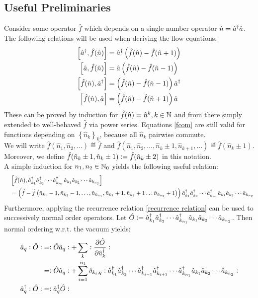 \subsection{Useful Preliminaries}
Consider some operator $\hat f$ which depends on a single number operator $\hat n=\hat a^\dagger\hat a$. The following relations will be used when deriving the flow equations:
\begin{subequations}
\label{fcom}
\begin{align}
\left[\hat a^\dagger,\hat f(\hat n) \right] &= \hat a^\dagger\left(\hat f(\hat n)-\hat f(\hat n+1)\right)\\ 
\left[\hat a,\hat f(\hat n) \right] &= \hat a\left(\hat f(\hat n)-\hat f(\hat n-1)\right)\\
\left[\hat f(\hat n),\hat a^\dagger \right] &= \left(\hat f(\hat n)-\hat f(\hat n-1)\right)\hat a^\dagger\\
\left[\hat f(\hat n),\hat a \right] &= \left(\hat f(\hat n)-\hat f(\hat n+1)\right)\hat a
\end{align}
\end{subequations}
These can be proved by induction for $\hat f(\hat n)=\hat n^k, k\in\mathbb{N}$ and from there simply extended to well-behaved $\hat f$ via power series. Equations \ref{fcom} are still valid for functions depending on $\left\{\hat n_k\right\}_k$, because all $\hat n_k$ pairwise commute.\\
We will write $\hat f\left(\hat n_1,\hat n_2,\hdots\right)\eqdef \hat f$ and $\hat f\left(\hat n_1,\hat n_2,\hdots,\hat n_k\pm 1,\hat n_{k+1},\hdots\right)\eqdef \hat f(\hat n_k\pm1)$. Moreover, we define $\hat f(\hat n_k\pm1,\hat n_{k}\pm1)\vcentcolon=\hat f(\hat n_k\pm2)$  in this notation.\\
A simple induction for $n_1,n_2\in\mathbb{N}_0$ yields the following useful relation:
\begin{align}
&\left[\hat f(\hat n),\hat a^\dagger_{k_1}\hat a^\dagger_{k_2}\cdots\hat a^\dagger_{k_{n_1}}\hat a_{k_1}\hat a_{k_2}\cdots\hat a_{k_{n_2}} \right] \nonumber \\ \quad& 
= \left(\hat f-\hat f\left(\hat n_{k_1}-1,\hat n_{k_2}-1,\hdots,\hat n_{k_{n_1}},\hat n_{k_1}+1,\hat n_{k_2}+1\hdots\hat n_{k_{n_2}}+1\right)\right)\hat a^\dagger_{k_1}\hat a^\dagger_{k_2}\cdots\hat a^\dagger_{k_{n_1}}\hat a_{k_1}\hat a_{k_2}\cdots\hat a_{k_{n_2}}
\end{align}
Furthermore, applying the recurrence relation \ref{recurrence relation} can be used to successively normal order operators. Let $\hat O\vcentcolon= \hat a^\dagger_{k_1}\hat a^\dagger_{k_2}\cdots\hat a^\dagger_{k_{n_1}}\hat a_{k_1}\hat a_{k_2}\cdots\hat a_{k_{n_2}}$. Then normal ordering w.r.t. the vacuum yields:
\begin{subequations}
\begin{align}
\hat a_q\vcentcolon\hat O\vcentcolon &=\vcentcolon\hat O\hat a_q\vcentcolon + \sum\limits_{k}\vcentcolon \frac{\partial \hat O}{\partial\hat a^\dagger_k}\vcentcolon \nonumber \\
 &= \vcentcolon\hat O\hat a_q\vcentcolon + \sum\limits_{i=1}^{n_1}\delta_{k_i,q}\vcentcolon \hat a^\dagger_{k_1}\hat a^\dagger_{k_2}\cdots\hat a^\dagger_{k_{i-1}}\hat a^\dagger_{k_{i+1}}\cdots\hat a^\dagger_{k_{n_1}}\hat a_{k_1}\hat a_{k_2}\cdots\hat a_{k_{n_2}}\vcentcolon \\
\hat a^\dagger_q\vcentcolon\hat O\vcentcolon &= \vcentcolon \hat a^\dagger_q\hat O\vcentcolon
\end{align}
\end{subequations}
